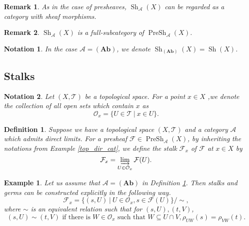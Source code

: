 \documentclass{article}
\newtheorem{definition}{Definition}[section]
\newtheorem{notation}{Notation}[section]
\newtheorem{remark}{Remark}[section]
\newtheorem{example}{Example}[section]
\numberwithin{equation}{section}
\DeclareMathOperator{\PreSh}{PreSh}
\DeclareMathOperator{\Sh}{Sh}
\begin{document}
\begin{remark}
As in the case of presheaves, $\Sh_\mathcal{A}(X)$ can be regarded as a category with sheaf morphisms.
\end{remark}

\begin{remark}
$\Sh_{\mathcal{A}}(X)$ is a full-subcategory of $\PreSh_{\mathcal{A}}(X)$.
\end{remark}

\begin{notation}
In the case $\mathcal{A}=(\mathbf{Ab})$, we denote $\Sh_{(\mathbf{Ab})}(X) = \Sh(X)$. 
\end{notation}

\subsection{Stalks}

\begin{notation}
Let $(X,\mathcal{T})$ be a topological space. For a point $x\in X$ ,we denote the collection of all open sets which contain $x$ as
\begin{equation*}
\mathcal{O}_x = \{U\in\mathcal{T}\:|\: x\in U\}.
\end{equation*}
\end{notation}

\begin{definition}
\label{def_stalk}
Suppose we have a topological space $(X,\mathcal{T})$ and a category $\mathcal{A}$ which admits direct limits. For a presheaf $\mathcal{F}\in\PreSh_{\mathcal{A}}(X)$, by inheriting the notations from Example \ref{top_dir_cat}, we define the stalk $\mathcal{F}_x$ of $\mathcal{F}$ at $x\in X$ by
\begin{equation*}
\mathcal{F}_x = \varinjlim_{U\in\mathcal{O}_x}\mathcal{F}(U).
\end{equation*}
\end{definition}

\begin{example}
\label{stalk_ex1}
Let us assume that $\mathcal{A}=(\mathbf{Ab})$ in Definition \ref{def_stalk}. Then stalks and germs can be constructed explicitly in the following way.
\begin{equation*}
\mathcal{F}_x = \{(s,U)\:|\: U\in\mathcal{O}_x, s\in\mathcal{F}(U)\}/\sim,
\end{equation*}
where $\sim$ is an equivalent relation such that for $(s,U),(t,V)$,
\begin{equation*}
(s,U)\sim(t,V) \text{ if there is } W\in\mathcal{O}_x \text{ such that } W\subseteq U\cap V, \rho_{UW}(s)=\rho_{VW}(t).
\end{equation*}
\end{example}
\end{document}

